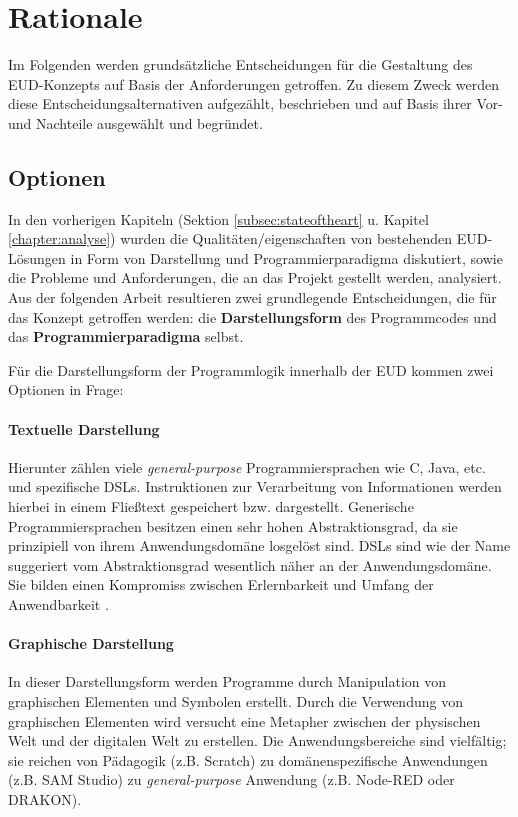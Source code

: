 \section{Rationale}\label{sec:einleitungkonzept}
Im Folgenden werden grundsätzliche Entscheidungen für die Gestaltung des \ac{EUD}-Kon\-zepts auf Basis der Anforderungen getroffen. Zu diesem Zweck werden diese Entscheidungsalternativen aufgezählt, beschrieben und auf Basis ihrer Vor- und Nachteile ausgewählt und begründet.

\subsection{Optionen}\label{subsec:optionen}
In den vorherigen Kapiteln (Sektion \ref{subsec:stateoftheart} u. Kapitel \ref{chapter:analyse}) wurden die Qualitäten/eigenschaften von bestehenden \ac{EUD}-Lösungen in Form von Darstellung und Programmierparadigma diskutiert, sowie die Probleme und Anforderungen, die an das Projekt gestellt werden, analysiert. Aus der folgenden Arbeit resultieren zwei grundlegende Entscheidungen, die für das Konzept getroffen werden: die \textbf{Darstellungsform} des Programmcodes und das \textbf{Programmierparadigma} selbst. 

Für die Darstellungsform der Programmlogik innerhalb der \ac{EUD} kommen zwei Optionen in Frage:
\paragraph{Textuelle Darstellung} Hierunter zählen viele \textit{general-purpose} Programmiersprachen wie C, Java, etc. und spezifische \acp{DSL}. Instruktionen zur Verarbeitung von Informationen werden hierbei in einem Fließtext gespeichert bzw. dargestellt. Generische Programmiersprachen besitzen einen sehr hohen Abstraktionsgrad, da sie prinzipiell von ihrem Anwendungsdomäne losgelöst sind. \acp{DSL} sind wie der Name suggeriert vom Abstraktionsgrad wesentlich näher an der Anwendungsdomäne. Sie bilden einen Kompromiss zwischen Erlernbarkeit und Umfang der Anwendbarkeit \cite{green1991comprehensibility}.

\paragraph{Graphische Darstellung} In dieser Darstellungsform werden Programme durch Manipulation von graphischen Elementen und Symbolen erstellt. Durch die Verwendung von graphischen Elementen wird versucht eine Metapher zwischen der physischen Welt und der digitalen Welt zu erstellen. Die Anwendungsbereiche sind vielfältig; sie reichen von Pädagogik (z.B. Scratch) zu domänenspezifische Anwendungen (z.B. SAM Studio) zu \textit{general-purpose} Anwendung (z.B. Node-RED oder DRAKON). 

